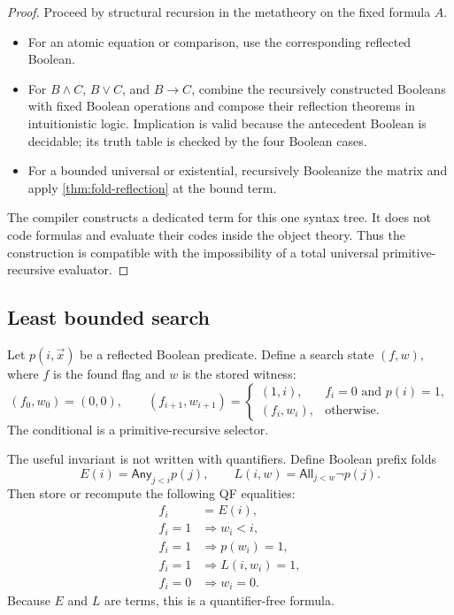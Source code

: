 \begin{proof}
Proceed by structural recursion in the metatheory on the fixed formula \(A\).
\begin{itemize}
  \item For an atomic equation or comparison, use the corresponding reflected Boolean.
  \item For \(B\wedge C\), \(B\vee C\), and \(B\to C\), combine the recursively constructed Booleans with fixed Boolean operations and compose their reflection theorems in intuitionistic logic.  Implication is valid because the antecedent Boolean is decidable; its truth table is checked by the four Boolean cases.
  \item For a bounded universal or existential, recursively Booleanize the matrix and apply \cref{thm:fold-reflection} at the bound term.
\end{itemize}
The compiler constructs a dedicated term for this one syntax tree.  It does not code formulas and evaluate their codes inside the object theory.  Thus the construction is compatible with the impossibility of a total universal primitive-recursive evaluator.
\end{proof}

\subsection{Least bounded search}

Let \(p(i,\vec x)\) be a reflected Boolean predicate.  Define a search state \((f,w)\), where \(f\) is the found flag and \(w\) is the stored witness:
\[
 (f_0,w_0)=(0,0),
 \qquad
 (f_{i+1},w_{i+1})=
 \begin{cases}
   (1,i),&f_i=0\text{ and }p(i)=1,\\
   (f_i,w_i),&\text{otherwise.}
 \end{cases}
\]
The conditional is a primitive-recursive selector.

The useful invariant is not written with quantifiers.  Define Boolean prefix folds
\[
 E(i)=\mathsf{Any}_{j<i}p(j),
 \qquad
 L(i,w)=\mathsf{All}_{j<w}\neg p(j).
\]
Then store or recompute the following QF equalities:
\begin{align*}
 f_i&=E(i),\\
 f_i=1&\Rightarrow w_i<i,\\
 f_i=1&\Rightarrow p(w_i)=1,\\
 f_i=1&\Rightarrow L(i,w_i)=1,\\
 f_i=0&\Rightarrow w_i=0.
\end{align*}
Because \(E\) and \(L\) are terms, this is a quantifier-free formula.

